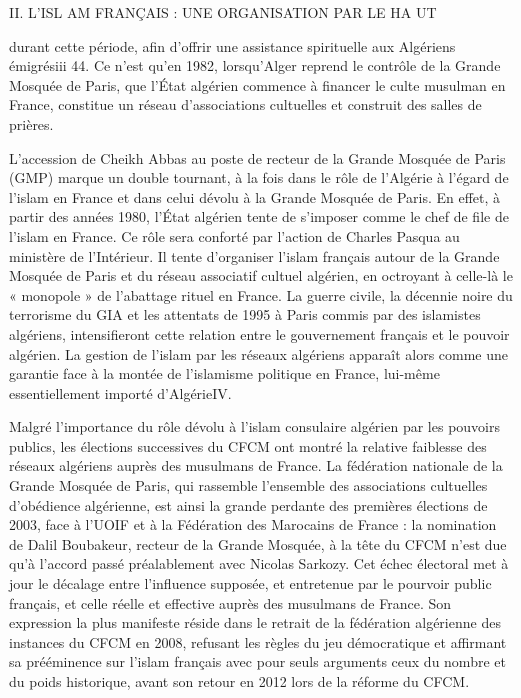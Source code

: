 II. L'ISL AM FRANÇAIS : UNE ORGANISATION PAR LE HA UT

durant cette période, afin d'offrir une assistance spirituelle aux
Algériens émigrésiii 44. Ce n'est qu'en 1982, lorsqu'Alger reprend le
contrôle de la Grande Mosquée de Paris, que l'État algérien commence à
financer le culte musulman en France, constitue un réseau d'associations
cultuelles et construit des salles de prières.

L'accession de Cheikh Abbas au poste de recteur de la Grande Mosquée de
Paris (GMP) marque un double tournant, à la fois dans le rôle de
l'Algérie à l'égard de l'islam en France et dans celui dévolu à la
Grande Mosquée de Paris. En effet, à partir des années 1980, l'État
algérien tente de s'imposer comme le chef de file de l'islam en France.
Ce rôle sera conforté par l'action de Charles Pasqua au ministère de
l'Intérieur. Il tente d'organiser l'islam français autour de la Grande
Mosquée de Paris et du réseau associatif cultuel algérien, en octroyant
à celle-là le « monopole » de l'abattage rituel en France. La guerre
civile, la décennie noire du terrorisme du GIA et les attentats de 1995
à Paris commis par des islamistes algériens, intensifieront cette
relation entre le gouvernement français et le pouvoir algérien. La
gestion de l'islam par les réseaux algériens apparaît alors comme une
garantie face à la montée de l'islamisme politique en France, lui-même
essentiellement importé d'AlgérieIV.

Malgré l'importance du rôle dévolu à l'islam consulaire algérien par les
pouvoirs publics, les élections successives du CFCM ont montré la
relative faiblesse des réseaux algériens auprès des musulmans de France.
La fédération nationale de la Grande Mosquée de Paris, qui rassemble
l'ensemble des associations cultuelles d'obédience algérienne, est ainsi
la grande perdante des premières élections de 2003, face à l'UOIF et à
la Fédération des Marocains de France : la nomination de Dalil
Boubakeur, recteur de la Grande Mosquée, à la tête du CFCM n'est due
qu'à l'accord passé préalablement avec Nicolas Sarkozy. Cet échec
électoral met à jour le décalage entre l'influence supposée, et
entretenue par le pourvoir public français, et celle réelle et effective
auprès des musulmans de France. Son expression la plus manifeste réside
dans le retrait de la fédération algérienne des instances du CFCM en
2008, refusant les règles du jeu démocratique et affirmant sa
prééminence sur l'islam français avec pour seuls arguments ceux du
nombre et du poids historique, avant son retour en 2012 lors de la
réforme du CFCM.

